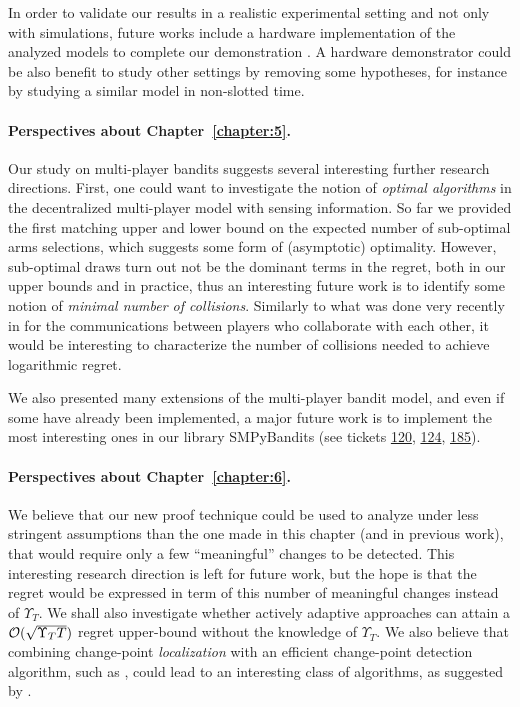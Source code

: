In order to validate our results in a realistic experimental setting and not only with simulations, future works include a hardware implementation of the analyzed models to complete our demonstration \cite{Besson2018ICT,Besson2019WCNC}.
%
A hardware demonstrator could be also benefit to study other settings by removing some hypotheses, for instance by studying a similar model in non-slotted time.


\paragraph{Perspectives about \textbf{Chapter~\ref{chapter:5}}.}

Our study on multi-player bandits suggests several interesting further research directions.
First, one could want to investigate the notion of \emph{optimal algorithms} in the decentralized multi-player model with sensing information. So far we provided the first matching upper and lower bound on the expected number of sub-optimal arms selections, which suggests some form of (asymptotic) optimality. However, sub-optimal draws turn out not be the dominant terms in the regret, both in our upper bounds and in practice, thus an interesting future work is to identify some notion of \emph{minimal number of collisions}.
Similarly to what was done very recently in \cite{wang2019distributed} for the communications between players who collaborate with each other, it would be interesting to characterize the number of collisions needed to achieve logarithmic regret.

We also presented many extensions of the multi-player bandit model,
and even if some have already been implemented, a major future work is to implement the most interesting ones in our library SMPyBandits
(see tickets \href{https://github.com/SMPyBandits/SMPyBandits/issues/120}{120}, \href{https://github.com/SMPyBandits/SMPyBandits/issues/124}{124}, \href{https://github.com/SMPyBandits/SMPyBandits/issues/185}{185}).


\paragraph{Perspectives about \textbf{Chapter~\ref{chapter:6}}.}

We believe that our new proof technique could be used to analyze \GLRklUCB{} under less stringent assumptions than the one made in this chapter (and in previous work), that would require only a few ``meaningful'' changes to be detected. This interesting research direction is left for future work,  but the hope is that the regret would be expressed in term of this number of meaningful changes instead of $\Upsilon_T$. We shall also investigate whether actively adaptive approaches can attain a $\mathcal{O}(\sqrt{\Upsilon_T T})$ regret upper-bound without the knowledge of $\Upsilon_T$.
We also believe that combining change-point \emph{localization} with an efficient change-point detection algorithm, such as \GLRklUCB, could lead to an interesting class of algorithms, as suggested by \cite{Maillard2018GLR}.

